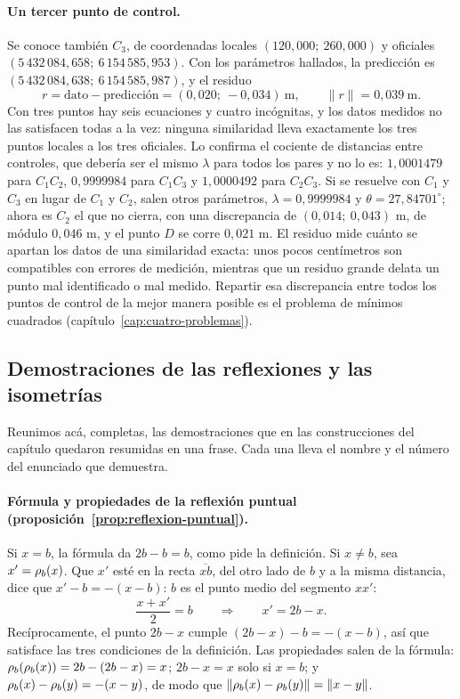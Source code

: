 \paragraph{Un tercer punto de control.} Se conoce también \(C_3\), de coordenadas locales
\((120{,}000;\ 260{,}000)\) y oficiales \((5\,432\,084{,}658;\ 6\,154\,585{,}953)\). Con los
parámetros hallados, la predicción es \((5\,432\,084{,}638;\ 6\,154\,585{,}987)\), y el residuo
\[
  r=\text{dato}-\text{predicción}=(0{,}020;\ -0{,}034)\ \text{m},\qquad \lVert r\rVert=0{,}039\ \text{m}.
\]
Con tres puntos hay seis ecuaciones y cuatro incógnitas, y los datos medidos no las satisfacen
todas a la vez: ninguna similaridad lleva exactamente los tres puntos locales a los tres
oficiales. Lo confirma el cociente de distancias entre controles, que debería ser el mismo
\(\lambda\) para todos los pares y no lo es: \(1{,}0001479\) para \(C_1C_2\), \(0{,}9999984\) para
\(C_1C_3\) y \(1{,}0000492\) para \(C_2C_3\). Si se resuelve con \(C_1\) y \(C_3\) en lugar de
\(C_1\) y \(C_2\), salen otros parámetros, \(\lambda=0{,}9999984\) y \(\theta=27{,}84701^\circ\);
ahora es \(C_2\) el que no cierra, con una discrepancia de \((0{,}014;\ 0{,}043)\) m, de módulo
\(0{,}046\) m, y el punto \(D\) se corre \(0{,}021\) m. El residuo mide cuánto se apartan los
datos de una similaridad exacta: unos pocos centímetros son compatibles con errores de
medición, mientras que un residuo grande delata un punto mal identificado o mal medido.
Repartir esa discrepancia entre todos los puntos de control de la mejor manera posible es el
problema de mínimos cuadrados (capítulo~\ref{cap:cuatro-problemas}).

\subsection{Demostraciones de las reflexiones y las isometrías}\label{sec:demos-reflexiones}

Reunimos acá, completas, las demostraciones que en las construcciones del capítulo quedaron
resumidas en una frase. Cada una lleva el nombre y el número del enunciado que demuestra.

\paragraph{Fórmula y propiedades de la reflexión puntual (proposición~\ref{prop:reflexion-puntual}).}
\begin{demostracion}
Si \(x=b\), la fórmula da \(2b-b=b\), como pide la definición. Si \(x\neq b\), sea
\(x'=\rho_{b}(x)\). Que \(x'\) esté en la recta \(\overline{xb}\), del otro lado de \(b\) y a la
misma distancia, dice que \(x'-b=-(x-b)\): \(b\) es el punto medio del segmento \(xx'\):
\[
  \frac{x+x'}{2}=b\qquad\Longrightarrow\qquad x'=2b-x .
\]
Recíprocamente, el punto \(2b-x\) cumple \((2b-x)-b=-(x-b)\), así que satisface las tres
condiciones de la definición. Las propiedades salen de la fórmula:
\(\rho_{b}(\rho_{b}(x))=2b-(2b-x)=x\); \(2b-x=x\) solo si \(x=b\); y
\(\rho_{b}(x)-\rho_{b}(y)=-(x-y)\), de modo que
\(\lVert\rho_{b}(x)-\rho_{b}(y)\rVert=\lVert x-y\rVert\).
\end{demostracion}

